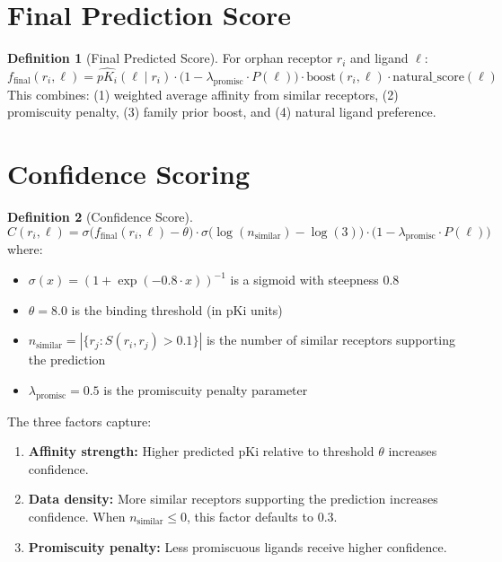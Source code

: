 \documentclass[12pt,oneside]{article}
\theoremstyle{definition}
\newtheorem{definition}{Definition}[section]
\newcommand{\sigmoid}{\sigma}
\begin{document}
\section{Final Prediction Score}

\begin{definition}[Final Predicted Score]
For orphan receptor $r_i$ and ligand $\ell$:
\begin{equation}
f_{\text{final}}(r_i, \ell) = \widehat{pK_i}(\ell \mid r_i) \cdot \bigl(1 - \lambda_{\text{promisc}} \cdot P(\ell)\bigr) \cdot \text{boost}(r_i, \ell) \cdot \text{natural\_score}(\ell)
\label{eq:final_score}
\end{equation}
This combines: (1) weighted average affinity from similar receptors, (2) promiscuity penalty, (3) family prior boost, and (4) natural ligand preference.
\end{definition}

\section{Confidence Scoring}

\begin{definition}[Confidence Score]
\begin{equation}
C(r_i, \ell) = \sigmoid\bigl(f_{\text{final}}(r_i, \ell) - \theta\bigr) \cdot \sigmoid\bigl(\log(n_{\text{similar}}) - \log(3)\bigr) \cdot \bigl(1 - \lambda_{\text{promisc}} \cdot P(\ell)\bigr)
\label{eq:confidence}
\end{equation}
where:
\begin{itemize}[nosep]
\item $\sigmoid(x) = (1 + \exp(-0.8 \cdot x))^{-1}$ is a sigmoid with steepness $0.8$
\item $\theta = 8.0$ is the binding threshold (in pKi units)
\item $n_{\text{similar}} = |\{r_j : S(r_i, r_j) > 0.1\}|$ is the number of similar receptors supporting the prediction
\item $\lambda_{\text{promisc}} = 0.5$ is the promiscuity penalty parameter
\end{itemize}
\end{definition}

The three factors capture:
\begin{enumerate}[label=(C\arabic*)]
\item \textbf{Affinity strength:} Higher predicted pKi relative to threshold $\theta$ increases confidence.
\item \textbf{Data density:} More similar receptors supporting the prediction increases confidence. When $n_{\text{similar}} \leq 0$, this factor defaults to $0.3$.
\item \textbf{Promiscuity penalty:} Less promiscuous ligands receive higher confidence.
\end{enumerate}
\end{document}
